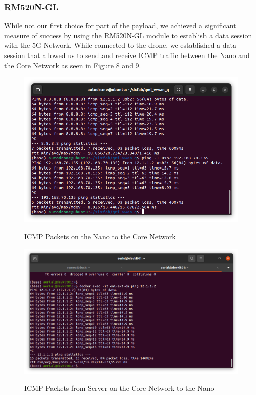 \documentclass[conference]{IEEEtran}
\begin{document}
\subsubsection{RM520N-GL}
While not our first choice for part of the payload, we achieved a significant measure of success by using the RM520N-GL module to establish a data session with the 5G Network. While connected to the drone, we established a data session that allowed us to send and receive ICMP traffic between the Nano and the Core Network as seen in Figure 8 and 9. 
\begin{figure}[htbp]
    \centering
    \resizebox{9cm}{5cm}
    {\includegraphics{figures/ICMP_nano.png}}
    \caption{ICMP Packets on the Nano to the Core Network}
    \label{icmp nano}
\end{figure}
\begin{figure}[htbp]
    \centering
    \resizebox{9cm}{5cm}
    {\includegraphics{figures/ICMP_core.png}}
    \caption{ICMP Packets from Server on the Core Network to the Nano}
    \label{icmp nano}
\end{figure}
\end{document}
